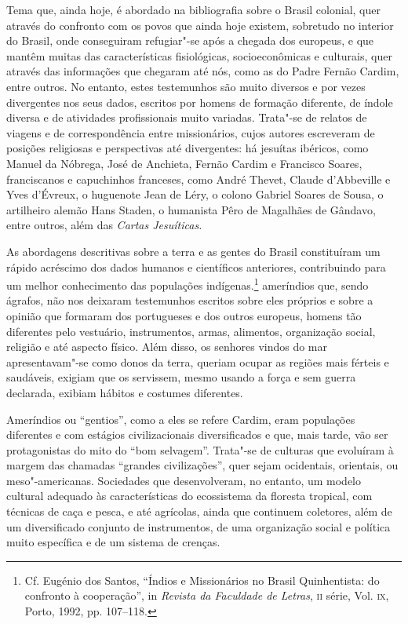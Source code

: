 Tema que, ainda hoje, é abordado na bibliografia sobre o Brasil
colonial, quer através do confronto com os povos que ainda hoje existem,
sobretudo no interior do Brasil, onde conseguiram refugiar"-se após a
chegada dos europeus, e que mantêm muitas das características
fisiológicas, socioeconômicas e culturais, quer através das informações
que chegaram até nós, como as do Padre Fernão Cardim, entre outros. No
entanto, estes testemunhos são muito diversos e por vezes divergentes
nos seus dados, escritos por homens de formação diferente, de índole
diversa e de atividades profissionais muito variadas. Trata"-se de
relatos de viagens e de correspondência entre missionários, cujos
autores escreveram de posições religiosas e perspectivas até
divergentes: há jesuítas ibéricos, como Manuel da Nóbrega, José de
Anchieta, Fernão Cardim e Francisco Soares, franciscanos e capuchinhos
franceses, como André Thevet, Claude d'Abbeville e Yves d'Évreux, o
huguenote Jean de Léry, o colono Gabriel Soares de Sousa, o artilheiro
alemão Hans Staden, o humanista Pêro de Magalhães de Gândavo, entre outros,
além das \textit{Cartas Jesuíticas.}

As abordagens descritivas sobre a terra e as gentes do Brasil
constituíram um rápido acréscimo dos dados humanos e científicos
anteriores, contribuindo para um melhor conhecimento das populações
indígenas.\footnote{ Cf. Eugénio dos Santos, ``Índios e
Missionários no Brasil Quinhentista: do confronto à cooperação'', in
\textit{Revista da Faculdade de Letras}, \textsc{ii} série, Vol. \textsc{ix}, Porto,
1992, pp. 107--118.} ameríndios que, sendo ágrafos, não nos deixaram
testemunhos escritos sobre eles próprios e sobre a opinião que formaram
dos portugueses e dos outros europeus, homens tão diferentes pelo
vestuário, instrumentos, armas, alimentos, organização social, religião
e até aspecto físico. Além disso, os senhores vindos do mar
apresentavam"-se como donos da terra, queriam ocupar as regiões mais
férteis e saudáveis, exigiam que os servissem, mesmo usando a força e
sem guerra declarada, exibiam hábitos e costumes diferentes.

Ameríndios ou ``gentios'', como a eles se refere Cardim, eram
populações diferentes e com estágios civilizacionais diversificados e
que, mais tarde, vão ser protagonistas do mito do ``bom selvagem''.
Trata"-se de culturas que evoluíram à margem das chamadas ``grandes
civilizações'', quer sejam ocidentais, orientais, ou meso"-americanas.
Sociedades que desenvolveram, no entanto, um modelo cultural adequado
às características do ecossistema da floresta tropical, com técnicas 
de caça e pesca, e até agrícolas, ainda que continuem coletores, 
além de um diversificado conjunto de instrumentos, de uma
organização social e política muito específica e de um sistema de crenças.

